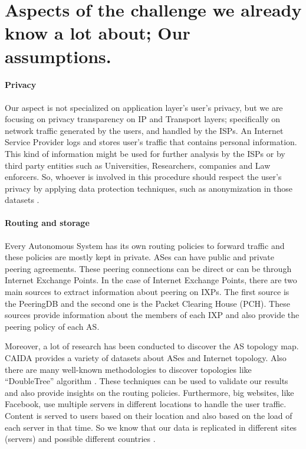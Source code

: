 \section{Aspects of the challenge we already know a lot about; Our
assumptions.}

\paragraph{Privacy}

Our aspect is not specialized  on application layer's  user's privacy,  
but we are focusing on privacy transparency on IP and Transport layers; 
specifically on  network traffic generated by the users, and  handled by the ISPs.
An Internet Service Provider logs and stores user's traffic that contains 
personal information. 
This kind of information might be used for further analysis by the ISPs or by 
third party entities such as Universities, Researchers, companies and Law enforcers.	
So, whoever is involved in this procedure should respect the user's privacy by 
applying data protection techniques, such as anonymization in those datasets
\cite{infsec, sweeney2002k, dark}.

\paragraph{Routing and storage}

Every Autonomous System has its own routing policies to forward traffic and these 
policies are mostly kept in private. ASes can have public and private peering 
agreements. These peering connections can be direct or can be through Internet 
Exchange Points. In the case of Internet Exchange Points, there are two main 
sources to extract information about peering on IXPs. The first source is the 
PeeringDB and the second one is the Packet Clearing House (PCH). 
These sources provide information about the members of each IXP and also provide
the peering policy of each AS. 

Moreover, a lot of research has been conducted to discover the AS topology map. 
CAIDA provides a variety of datasets about ASes and Internet topology. Also there 
are many well-known methodologies to discover topologies like ``DoubleTree'' 
algorithm \cite{caida}. These techniques can be used  to validate our results 
and also provide insights on the routing policies. Furthermore, big websites, 
like Facebook, use multiple servers in different locations to handle the user 
traffic. Content is served to users based on their location and 
also based on the load of each server in that time. So we know that our data is 
replicated in different sites (servers) and possible different countries \cite{dark}. 


